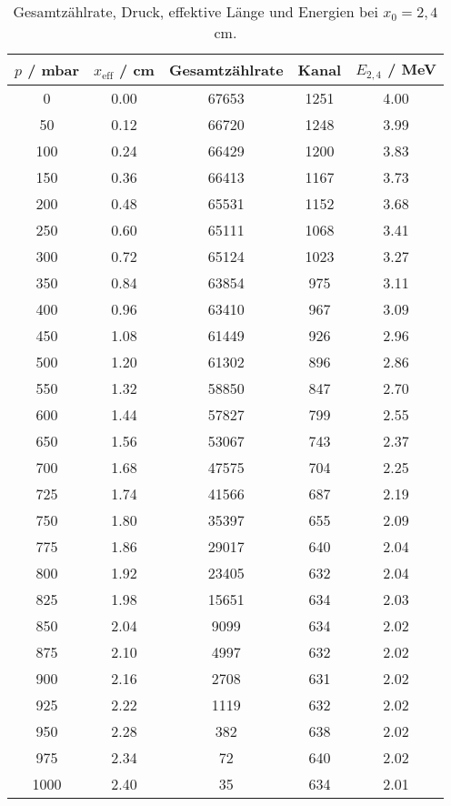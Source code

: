 \begin{table}[!htp]
\centering
\caption{Gesamtzählrate, Druck, effektive Länge und Energien bei $x_0 = 2,4$ cm.}
\label{tab:d24cm}
\begin{tabular}{S[table-format=4.0] S[table-format=1.2] S[table-format=5.0] S[table-format=4.0] S[table-format=1.2]}
\toprule
{$p$ / mbar} & {$x_\text{eff}$ / cm} & {Gesamtzählrate} & {Kanal} & {$E_{2,4}$ / MeV} \\
 & 0.00 & 67653 & 1251 & 4.00\\
  50 & 0.12 & 66720 & 1248 & 3.99\\
 100 & 0.24 & 66429 & 1200 & 3.83\\
 150 & 0.36 & 66413 & 1167 & 3.73\\
 200 & 0.48 & 65531 & 1152 & 3.68\\
 250 & 0.60 & 65111 & 1068 & 3.41\\
 300 & 0.72 & 65124 & 1023 & 3.27\\
 350 & 0.84 & 63854 &  975 & 3.11\\
 400 & 0.96 & 63410 &  967 & 3.09\\
 450 & 1.08 & 61449 &  926 & 2.96\\
 500 & 1.20 & 61302 &  896 & 2.86\\
 550 & 1.32 & 58850 &  847 & 2.70\\
 600 & 1.44 & 57827 &  799 & 2.55\\
 650 & 1.56 & 53067 &  743 & 2.37\\
 700 & 1.68 & 47575 &  704 & 2.25\\
 725 & 1.74 & 41566 &  687 & 2.19\\
 750 & 1.80 & 35397 &  655 & 2.09\\
 775 & 1.86 & 29017 &  640 & 2.04\\
 800 & 1.92 & 23405 &  632 & 2.04\\
 825 & 1.98 & 15651 &  634 & 2.03\\
 850 & 2.04 &  9099 &  634 & 2.02\\
 875 & 2.10 &  4997 &  632 & 2.02\\
 900 & 2.16 &  2708 &  631 & 2.02\\
 925 & 2.22 &  1119 &  632 & 2.02\\
 950 & 2.28 &   382 &  638 & 2.02\\
 975 & 2.34 &    72 &  640 & 2.02\\
1000 & 2.40 &    35 &  634 & 2.01\\
\bottomrule
\end{tabular}
\end{table}